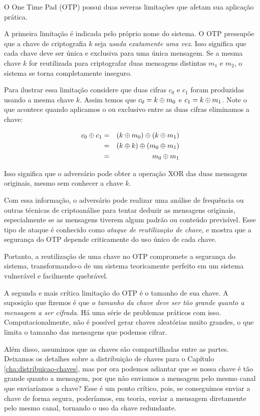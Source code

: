 O One Time Pad (OTP) possui duas severas limitações que afetam sua aplicação prática.

A primeira limitação é indicada pelo próprio nome do sistema.
O OTP pressupõe que a chave de criptografia $k$ seja {\em usada exatamente uma vez}.
Isso significa que cada chave deve ser única e exclusiva para uma única mensagem.
Se a mesma chave $k$ for reutilizada para criptografar duas mensagens distintas $m_1$ e $m_2$, o sistema se torna completamente inseguro.

Para ilustrar essa limitação considere que duas cifras $c_0$ e $c_1$ foram produzidas usando a mesma chave $k$.
Assim temos que $c_0 = k \oplus m_0$ e $c_1 = k \oplus m_1$.
Note o que acontece quando aplicamos o ou exclusivo entre as duas cifras eliminamos a chave:

\begin{eqnarray*}
  c_0 \oplus c_1 & = & (k \oplus m_0) \oplus (k \oplus m_1)\\
              & = & (k \oplus k) \oplus (m_0 \oplus m_1)\\
              & = & m_0 \oplus m_1
\end{eqnarray*}

Isso significa que o adversário pode obter a operação XOR das duas mensagens originais, mesmo sem conhecer a chave $k$.

Com essa informação, o adversário pode realizar uma análise de frequência ou outras técnicas de criptoanálise para tentar deduzir as mensagens originais, especialmente se as mensagens tiverem algum padrão ou conteúdo previsível.
Esse tipo de ataque é conhecido como {\em ataque de reutilização de chave}, e mostra que a segurança do OTP depende criticamente do uso único de cada chave.

Portanto, a reutilização de uma chave no OTP compromete a segurança do sistema, transformando-o de um sistema teoricamente perfeito em um sistema vulnerável e facilmente quebrável.

A segunda e mais crítica limitação do OTP é o tamanho de sua chave.
A suposição que fizemos é que {\em o tamanho da chave deve ser tão grande quanto a mensagem a ser cifrada}.
Há uma série de problemas práticos com isso.
Computacionalmente, não é possível gerar chaves aleatórias muito grandes, o que limita o tamanho das mensagens que podemos cifrar.

Além disso, assumimos que as chaves são compartilhadas entre as partes.
Deixamos os detalhes sobre a distribuição de chaves para o Capítulo \ref{cha:distribuicao-chaves}, mas por ora podemos adiantar que se nossa chave é tão grande quanto a mensagem, por que não enviamos a mensagem pelo mesmo canal que enviaríamos a chave?
Esse é um ponto crítico, pois, se conseguimos enviar a chave de forma segura, poderíamos, em teoria, enviar a mensagem diretamente pelo mesmo canal, tornando o uso da chave redundante.

